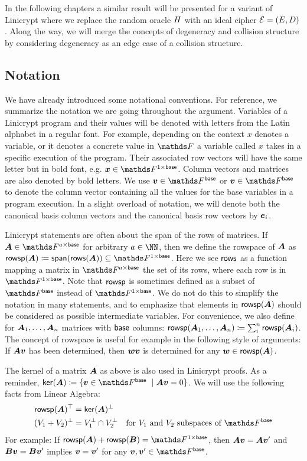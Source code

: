 In the following chapters a similar result will be presented for a variant of Linicrypt
where we replace the random oracle $H$ with an ideal cipher $\mathcal{E}=(E, D)$.
Along the way,
we will merge the concepts of degeneracy and collision structure by considering degeneracy as an edge case of a collision structure.

\subsection{Notation}
We have already introduced some notational conventions.
For reference, we summarize the notation we are going throughout the argument.
Variables of a Linicrypt program and their values will be denoted with letters from the Latin alphabet in a regular font.
For example, depending on the context $x$ denotes a variable, or it denotes a concrete value in $\F$ a variable called $x$ takes in a specific execution of the program.
Their associated row vectors will have the same letter but in bold font, e.g. $\vx \in \Frowsp$.
Column vectors and matrices are also denoted by bold letters.
We use $\vbase \in \Fsp$ or $\vv \in \Fsp$ to denote the column vector containing all the values for the base variables in a program execution.
In a slight overload of notation,
we will denote both the canonical basis column vectors and the canonical basis row vectors by $\boldsymbol e_i$.

Linicrypt statements are often about the span of the rows of matrices.
If $\v A \in \F^{a\times\base}$ for arbitrary $a \in \NN$,
then we define the rowspace of $\boldsymbol A$ as $\rowsp(\v A) \coloneqq \spn(\rows(\v A)) \subseteq \Frowsp$.
Here we see $\mathsf{rows}$ as a function mapping a matrix in $\F^{a\times\base}$ the set of its rows, where each row is in $\Frowsp$.
Note that $\mathsf{rowsp}$ is sometimes defined as a subset of $\Fsp$ instead of $\Frowsp$.
We do not do this to simplify the notation in many statements,
and to emphasize that elements in $\mathsf{rowsp}(\boldsymbol A)$ should be considered as possible intermediate variables.
For convenience, we also define for $\boldsymbol A_1, \dots, \boldsymbol A_{n}$ matrices with $\mathsf{base}$ columns: $\mathsf{rowsp}(\boldsymbol A_1, \dots, \boldsymbol A_{n}) \coloneqq \sum_i^n \mathsf{rowsp}(\boldsymbol A_i)$.
The concept of rowspace is useful for example in the following style of arguments:
If $\boldsymbol A\boldsymbol v$ has been determined, then $\boldsymbol w\boldsymbol v$ is determined for any $\boldsymbol w \in \mathsf{rowsp}(\boldsymbol A)$.

The kernel of a matrix $\boldsymbol A$ as above is also used in Linicrypt proofs.
As a reminder, $\ker(\v A) \coloneqq \{ \vv \in \Fsp\ \mid \v A \vv = 0\}$.
We will use the following facts from Linear Algebra:
\begin{align*}
  \rowsp(\v A)^\top &= \ker(\v A)^\perp \\
  (V_1 + V_2)^\perp &= V_1^\perp \cap V_2^\perp \quad \textrm{for $V_1$ and $V_2$ subspaces of $\Fsp$}
\end{align*}
For example:
If $\rowsp(\v A) + \rowsp(\v B) = \Frowsp$,
then $\boldsymbol A \boldsymbol v = \boldsymbol A \boldsymbol v'$ and $\boldsymbol B \boldsymbol v = \boldsymbol B \boldsymbol v'$ implies $\boldsymbol v = \boldsymbol v'$ for any $\vv, \vv' \in \Fsp$.

